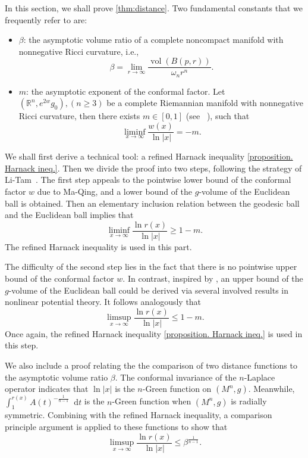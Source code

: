 \documentclass[12pt]{amsart}
\theoremstyle{plain}
\theoremstyle{definition}
\theoremstyle{remark}     %
\numberwithin{equation}{section}
\newcommand{\dd}{\mathop{}\!\mathrm{d}}%
\begin{document}
In this section, we shall prove \cref{thm:distance}.  Two fundamental constants that we frequently refer to are: 
\begin{itemize}
    \item $\beta$: the asymptotic volume ratio of a complete noncompact manifold with nonnegative Ricci curvature, i.e., 
    \begin{equation*}
        \beta=\lim_{r\to \infty}\frac{\operatorname{vol}(B(p,r))}{\omega_nr^n}.
    \end{equation*}
    \item $m$: the asymptotic exponent of the conformal factor. Let $(\mathbb{R}^n, e^{2w}g_0),(n\geq 3)$ be a complete Riemannian manifold with nonnegative Ricci curvature, then there exists $m\in [0,1]$ (see ~\cite[Theorem 1.3]{MQ}), such that
    \begin{equation}\label{def of m}
        \liminf_{x\to \infty} 
    \frac{ w(x)}{\ln |x|}=-m.
    \end{equation}  
\end{itemize}

We shall first derive a technical tool: a refined Harnack inequality \cref{proposition. Harnack ineq.}. Then we divide the proof into two steps, following the strategy of Li-Tam~\cite{LT2}. The first step appeals to the pointwise lower bound of the conformal factor $w$ due to Ma-Qing, and a lower bound of the $g$-volume of the Euclidean ball is obtained. Then an elementary inclusion relation between the geodesic ball and the Euclidean ball implies that
    \[
        \liminf_{x\to \infty}\frac{\ln r(x)}{\ln |x|}\geq 1-m.
    \]
The refined Harnack inequality is used in this part.

The difficulty of the second step lies in the fact that there is no pointwise upper bound of the conformal factor $w$. In contrast, inspired by \cite[Theorem 3.1, Proposition 4.1]{MQ}, an upper bound of the $g$-volume of the Euclidean ball could be derived via several involved results in nonlinear potential theory. It follows analogously that
    \[
        \limsup_{x\to \infty}\frac{\ln r(x)}{\ln |x|}\leq 1-m.
    \]
Once again, the refined Harnack inequality \cref{proposition. Harnack ineq.} is used in this step.

We also include a proof relating the the comparison of two distance functions to the asymptotic volume ratio $\beta$. The conformal invariance of the $n$-Laplace operator indicates that $\ln |x|$ is the $n$-Green function on $(M^n,g)$. Meanwhile, $\int_1^{r(x)}A(t)^{-\frac{1}{n-1}}\dd t$ is the $n$-Green function when $(M^n,g)$ is radially symmetric. Combining with the refined  Harnack inequality, a comparison principle argument is applied to these functions to show that 
    \[
        \limsup_{x\to\infty}\frac{\ln r(x)}{\ln |x|}\leq \beta^{\frac{1}{n-1}}.
    \]
\end{document}
